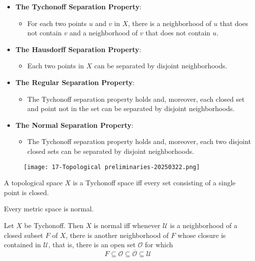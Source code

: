 \begin{itemize}
	\item \textbf{The Tychonoff Separation Property}:
	\begin{itemize}
		\item For each two points $u$ and $v$ in $X$, there is a neighborhood of $u$ that does not contain $v$ and a neighborhood of $v$ that does not contain $u$.
	\end{itemize}
	\item \textbf{The Hausdorff Separation Property}:
	\begin{itemize}
		\item Each two points in $X$ can be separated by disjoint neighborhoods.
	\end{itemize}
	\item \textbf{The Regular Separation Property}:
	\begin{itemize}
		\item The Tychonoff separation property holds and, moreover, each closed set and point not in the set can be separated by disjoint neighborhoods.
	\end{itemize}
	\item \textbf{The Normal Separation Property}:
	\begin{itemize}
		\item The Tychonoff separation property holds and, moreover, each two disjoint closed sets can be separated by disjoint neighborhoods.
	\end{itemize}
\end{itemize}

\begin{figure}[H]
\centering
\texttt{[image: 17-Topological preliminaries-20250322.png]}
\label{}
\end{figure}

\begin{proposition}
A topological space $X$ is a Tychonoff space iff every set consisting of a single point is closed.
\end{proposition}
\begin{proposition}
Every metric space is normal.
\end{proposition}
\begin{proposition}
Let $X$ be Tychonoff. Then $X$ is normal iff whenever $\mathcal{U}$ is a neighborhood of a closed subset $F$ of $X$, there is another neighborhood of $F$ whose closure is contained in $\mathcal{U}$, that is, there is an open set $\mathcal{O}$ for which
\[
F\subseteq \mathcal{O}\subseteq  \overline{\mathcal{O}}\subseteq \mathcal{U}
\]
\end{proposition}

